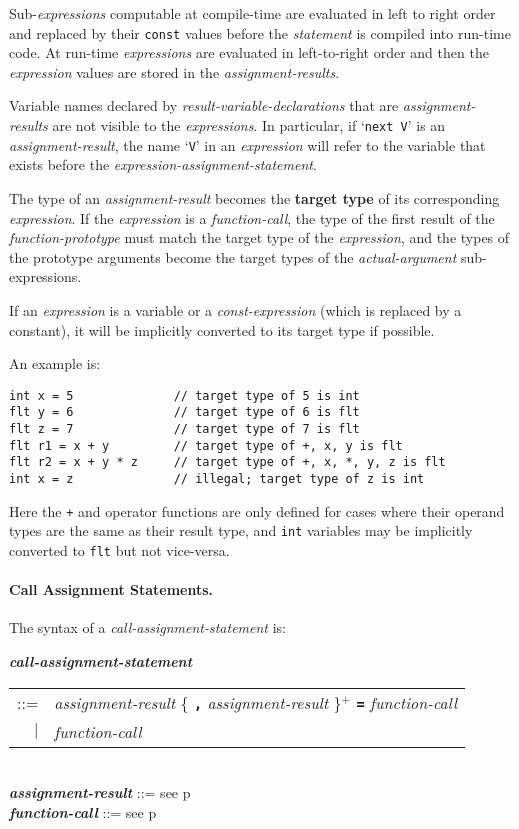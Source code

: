 \documentclass[12pt]{article}
\newcommand{\subsubsubsection}[1]{\paragraph[#1]{#1.}}
\newcommand{\TT}[1]{{\tt \bfseries #1}}
\newcommand{\PLUS}[1][]{{$^{+#1}$}}
\newcommand{\key}[1]{{\rm \bfseries #1}}
\newcommand{\emkey}[1]{{\em \bfseries #1}}
\newcommand{\pagref}[1]{p\pageref{#1}}
\newenvironment{indpar}[1][0.3in]%
	{\begin{list}{}%
		     {\setlength{\itemsep}{0in}%
		      \setlength{\topsep}{0in}%
		      \setlength{\parsep}{1ex}%
		      \setlength{\labelwidth}{#1}%
		      \setlength{\leftmargin}{#1}%
		      \addtolength{\leftmargin}{\labelsep}}%
	 \item}%
	{\end{list}}
\begin{document}
Sub-{\em expressions} computable at compile-time are evaluated
in left to right order and replaced by their {\tt const} values
before the {\em statement} is compiled into run-time code.
At run-time {\em expressions} are evaluated in left-to-right order and
then the {\em expression} values are stored in the {\em assignment-results}.

Variable names declared by {\em result-variable-declarations} that are
{\em assignment-results} are not visible to the {\em expressions}.
In particular, if `{\tt next V}' is an {\em assignment-result},
the name `{\tt V}' in an {\em expression} will refer to the variable
that exists before the {\em expression-assignment-statement}.

The type of an {\em assignment-result} becomes the \key{target type}
of its corresponding {\em expression}.  If the {\em expression}
is a {\em function-call}, the type of the first result of the
{\em function-prototype} must match the target type of the {\em expression},
and the types of the prototype arguments become the target types
of the {\em actual-argument} sub-expressions.

If an {\em expression} is a variable or a {\em const-expression}
(which is replaced by a constant),
it will be implicitly
converted to its target type if possible.

An example is:
\begin{indpar}\begin{verbatim}
int x = 5              // target type of 5 is int
flt y = 6              // target type of 6 is flt
flt z = 7              // target type of 7 is flt
flt r1 = x + y         // target type of +, x, y is flt
flt r2 = x + y * z     // target type of +, x, *, y, z is flt
int x = z              // illegal; target type of z is int
\end{verbatim}\end{indpar}

Here the {\tt +} and {\tt *} operator functions are only defined
for cases where their operand types are the same as their result type,
and {\tt int} variables may be implicitly converted to {\tt flt}
but not vice-versa.

\subsubsubsection{Call Assignment Statements}
\label{CALL-ASSIGNMENT-STATEMENTS}

The syntax of a {\em call-assignment-statement} is:
\begin{indpar}
\emkey{call-assignment-statement} \\
\hspace*{0.5in} \begin{tabular}{rl}
                ::= & {\em assignment-result}
                      \{ \TT{,} {\em assignment-result} \}\PLUS{}
		      \TT{=} {\em function-call} \\
		$|$ & {\em function-call}
		\end{tabular}
\\[0.5ex]
\emkey{assignment-result} ::= see \pagref{ASSIGNMENT-RESULT}
\\[0.5ex]
\emkey{function-call} ::= see \pagref{FUNCTION-CALL}
\end{indpar}
\end{document}
